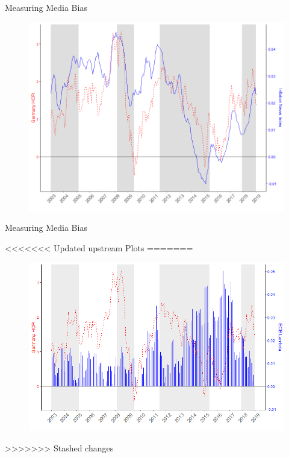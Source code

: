 \documentclass[aspectratio=169,xcolor=dvipsnames]{beamer}
\begin{document}

\begin{frame}{Measuring Media Bias}

 \begin{figure}[!ht]
    \centering
    \includegraphics{Inflation_Sentiment_Direction.png}
    \label{Inflation_Sentiment_Direction}
    \end{figure}

\end{frame}



\begin{frame}{Measuring Media Bias}

<<<<<<< Updated upstream
Plots
=======
   \begin{figure}[!ht]
    \centering
    \includegraphics{ECB Lambda.png}
    \end{figure}
>>>>>>> Stashed changes

\end{frame}
\end{document}
